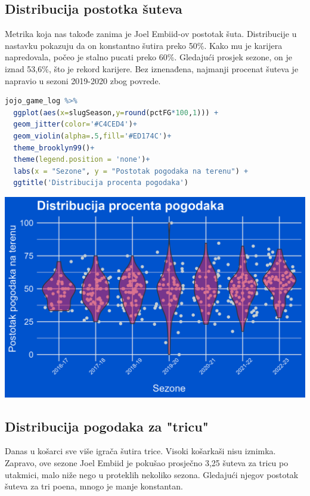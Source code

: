 \documentclass[letterpaper,11pt,leqno]{article}
\begin{document}
\subsection{Distribucija postotka šuteva}

Metrika koja nas takođe zanima je Joel Embiid-ov postotak šuta. Distribucije u nastavku pokazuju da on konstantno šutira preko 50\%. Kako mu je karijera napredovala, počeo je stalno pucati preko 60\%. Gledajući prosjek sezone, on je iznad 53,6\%, što je rekord karijere. Bez iznenađena, najmanji procenat šuteva je napravio u sezoni 2019-2020 zbog povrede.

\begin{lstlisting}[language=R]
jojo_game_log %>%
  ggplot(aes(x=slugSeason,y=round(pctFG*100,1))) +
  geom_jitter(color='#C4CED4')+
  geom_violin(alpha=.5,fill='#ED174C')+ 
  theme_brooklyn99()+
  theme(legend.position = 'none')+
  labs(x = "Sezone", y = "Postotak pogodaka na terenu") + 
  ggtitle('Distribucija procenta pogodaka')
\end{lstlisting}

\begin{center}
    \includegraphics{DistribucijaPogodaka.png}
\end{center}


\subsection{Distribucija pogodaka za "tricu"}

Danas u košarci sve više igrača šutira trice. Visoki košarkaši nisu iznimka. Zapravo, ove sezone Joel Embiid je pokušao prosječno 3,25 šuteva za tricu po utakmici, malo niže nego u proteklih nekoliko sezona. Gledajući njegov postotak šuteva za tri poena, mnogo je manje konstantan.
\end{document}
